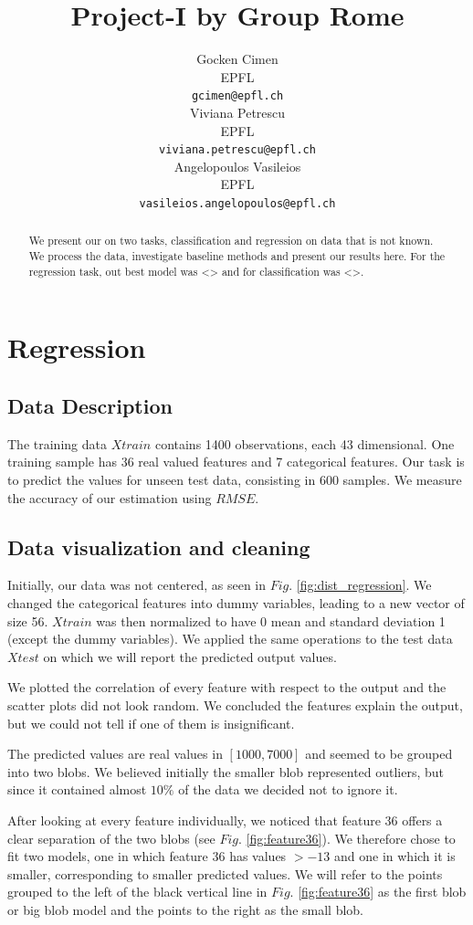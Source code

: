\documentclass{article} %
\title{Project-I by Group Rome}
\author{
Gocken Cimen\\
EPFL \\
\texttt{gcimen@epfl.ch} \\
\And
Viviana Petrescu\\
EPFL \\
\texttt{viviana.petrescu@epfl.ch} \\
\And
Angelopoulos Vasileios \\
EPFL \\
\texttt{vasileios.angelopoulos@epfl.ch} \\
}
\begin{document}
\maketitle

\begin{abstract}
We present our on two tasks, classification and regression on data that is not known. We process the data, investigate baseline methods and present our results here.
For the regression task, out best model was <> and for classification was <>.
\end{abstract}

\section{Regression}
\subsection{Data Description}
The training data $Xtrain$ contains 1400 observations, each 43 dimensional. One training sample has 36 real valued features and 7 categorical features. Our task is to predict the values for unseen test data, consisting in 600 samples. We measure the accuracy of our estimation using $RMSE$. 

\subsection{Data visualization and cleaning}
Initially, our data was not centered, as seen in $Fig.$ \ref{fig:dist_regression}.
We changed the categorical features into dummy variables, leading to a new vector of size 56. $Xtrain$ was then normalized to have 0 mean and standard deviation 1 (except the dummy variables). We applied the same operations to the test data $Xtest$ on which we will report the predicted output values.

 We plotted the correlation of every feature with respect to the output and the scatter plots did not look random. We concluded the features explain the output, but we could not tell if one of them is insignificant.

The predicted values are real values in $[1000,7000]$ and seemed to be grouped into two blobs. We believed initially the smaller blob represented outliers, but since it contained almost $10\%$ of the data we decided not to ignore it.

After looking at every feature individually, we noticed that feature 36 offers a clear separation of the two blobs (see $Fig.$ \ref{fig:feature36}). We therefore chose to fit two models, one in which feature 36 has values $>-13$ and one in which it is smaller, corresponding to smaller predicted values. We will refer to the points grouped to the left of the black vertical line in $Fig.$ \ref{fig:feature36} as the first blob or big blob model and the points to the right as the small blob.
\end{document}
